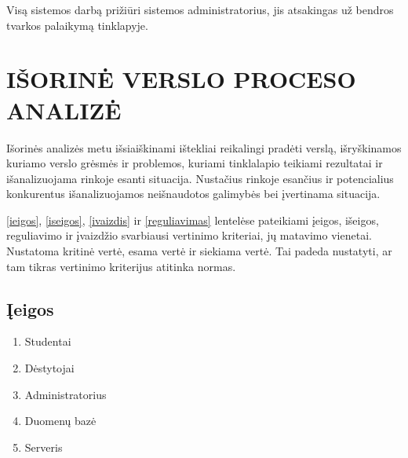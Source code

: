 \documentclass{VUMIFPSkursinis}
\begin{document}
Visą sistemos darbą prižiūri sistemos administratorius, jis atsakingas už bendros tvarkos palaikymą tinklapyje.

\newpage
\section{IŠORINĖ VERSLO PROCESO ANALIZĖ}
Išorinės analizės metu išsiaiškinami ištekliai
reikalingi pradėti verslą, išryškinamos kuriamo verslo grėsmės ir
problemos, kuriami tinklalapio teikiami rezultatai ir išanalizuojama rinkoje esanti situacija. Nustačius rinkoje esančius ir potencialius konkurentus išanalizuojamos
neišnaudotos galimybės bei įvertinama situacija.

\ref{ieigos}, \ref{iseigos}, \ref{ivaizdis} ir \ref{reguliavimas} lentelėse pateikiami įeigos, išeigos, reguliavimo ir įvaizdžio svarbiausi vertinimo kriteriai,
jų matavimo vienetai. Nustatoma kritinė vertė, esama vertė ir siekiama vertė. Tai padeda
nustatyti, ar tam tikras vertinimo kriterijus atitinka normas.
\subsection{Įeigos}
\begin{enumerate}
	\item Studentai
	\item Dėstytojai
	\item Administratorius
	\item Duomenų bazė
	\item Serveris
\end{enumerate}
\begin{table}[H]
	\centering
	\caption{Įeigos}
	\label{ieigos}
\end{table}
\end{document}
